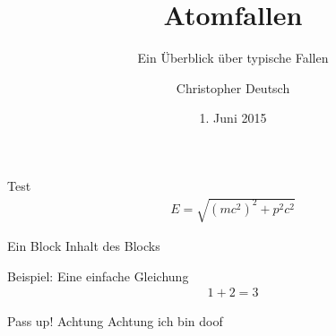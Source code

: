 \documentclass[16pt]{beamer}
\author{Christopher Deutsch}
\title{Atomfallen}
\subtitle{Ein Überblick über typische Fallen}
\institute{Rheinische Friedrich-Wilhelms-Universität Bonn \\ Proseminar Präsentationstechnik SS15}
\date{1. Juni 2015}
\begin{document}
	\maketitle
	
	\begin{frame}
		Test
		\begin{align}
			E = \sqrt{(m c^2)^2 + p^2 c^2}
		\end{align}
		
		\begin{block}{Ein Block}
			Inhalt des Blocks
		\end{block}
		
		\begin{exampleblock}{Beispiel:}
			Eine einfache Gleichung
			\begin{align*}
				1 + 2 = 3
			\end{align*}
		\end{exampleblock}
		
		\begin{alertblock}{Pass up!}
			Achtung Achtung ich bin doof
		\end{alertblock}
			
	\end{frame}
\end{document}
